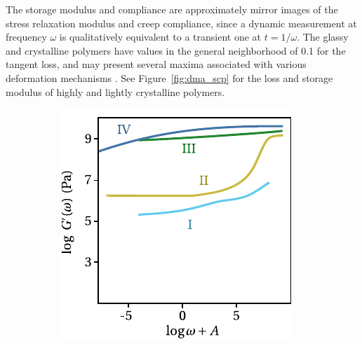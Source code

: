 The storage modulus and compliance are approximately mirror images of the stress relaxation modulus and creep compliance, since a dynamic measurement at frequency $\omega$ is qualitatively equivalent to a transient one at $t=1/\omega$.
The glassy and crystalline polymers have values in the general neighborhood of 0.1 for the tangent loss, and may present several maxima associated with various deformation mechanisms \citep{ferryViscoelasticPropertiesPolymers1980}.
See Figure~\ref{fig:dma_scp} for the loss and storage modulus of highly and lightly crystalline polymers.
\begin{figure}[hbtp]
\centering
\begin{subfigure}[b]{0.45\textwidth}
\centering
\includegraphics[width=\textwidth]{figures/storage_modulus_scp}
\caption{}
\label{subfig:storage_modulus_scp}
\end{subfigure} \hfill
	\begin{subfigure}[b]{0.45\textwidth}
		\centering

\end{subfigure}
\end{figure}
